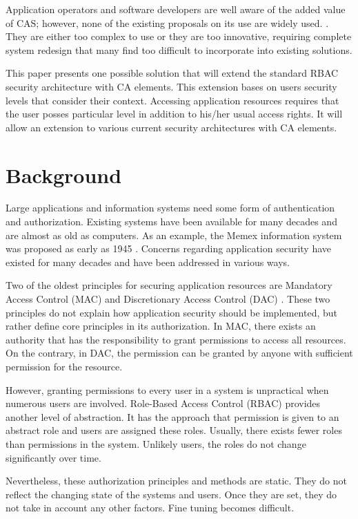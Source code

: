 \documentclass{sig-alternate-05-2015}
\begin{document}
Application operators and software developers are well aware of the added value of CAS; however, none of the existing proposals on its use are widely used. \cite{ubiscom,envroles,hung,contextawarerbac,genericcontext,contextAwareMobile,grbac,xorbac,contextroles,eacl,contextaccess,wendong}. They are either too complex to use or they are too innovative, requiring complete system redesign that many find too difficult to incorporate into existing solutions.

This paper presents  one possible solution that will extend the standard RBAC security architecture with CA elements. This extension bases on users security levels that consider their context. Accessing application resources requires that the user posses particular level in addition to his/her usual access rights. It will allow an extension to various current security architectures with CA elements.

\section{Background}
Large applications and information systems need some form of authentication and authorization. Existing systems have been available for many decades and are almost as old as computers. As an example, the Memex information system was proposed as early as 1945 \cite{memex}. Concerns regarding application security have existed for many decades and have been addressed in various ways.

Two of the oldest principles for securing application resources are Mandatory Access Control (MAC) \cite{accesscontrol} and Discretionary Access Control (DAC) \cite{accesscontrol}. These two principles do not explain how application security should be implemented, but rather define core principles in its authorization. In MAC, there exists an authority that has the responsibility to grant permissions to access all resources. On the contrary, in DAC, the permission can be granted by anyone with sufficient permission for the resource.

However, granting permissions to every user in a system is unpractical when numerous users are involved. Role-Based Access Control (RBAC) \cite{rbac} provides another level of abstraction. It has the approach that permission is given to an abstract role and users are assigned these roles. Usually, there exists fewer roles than permissions in the system. Unlikely users, the roles do not change significantly over time.

Nevertheless, these authorization principles and methods are static. They do not reflect the changing state of the systems and users. Once they are set, they do not take in account any other factors. Fine tuning becomes difficult.
\end{document}
